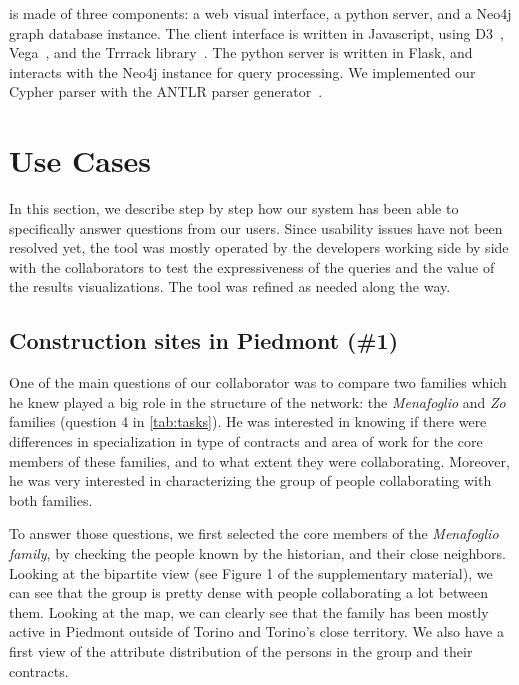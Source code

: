 \name is made of three components: a web visual interface, a python server, and a Neo4j graph database instance. The client interface is written in Javascript, using D3~\cite{d3}, Vega~\cite{satyanarayan2016vega}, and the Trrrack library~\cite{cutler_trrack_2020}. The python server is written in Flask, and interacts with the Neo4j instance for query processing.
We implemented our Cypher parser with the ANTLR parser generator~\cite{parr1995antlr}.





\section{Use Cases}\label{sec:usecases}

In this section, we describe step by step how our system has been able to specifically answer questions from our users.
Since usability issues have not been resolved yet, the tool was mostly operated by the developers working side by side with the collaborators to test the expressiveness of the queries and the value of the results visualizations. The tool was refined as needed along the way.

\subsection{Construction sites in Piedmont (\#1)}

One of the main questions of our collaborator was to compare two families which he knew played a big role in the structure of the network: the \textit{Menafoglio} and \textit{Zo} families (question 4 in \autoref{tab:tasks}). He was interested in knowing if there were differences in specialization in type of contracts and area of work for the core members of these families, and to what extent they were collaborating. Moreover, he was very interested in characterizing the group of people collaborating with both families.

To answer those questions, we first selected the core members of the \textit{Menafoglio family}, by checking the people known by the historian, and their close neighbors. Looking at the bipartite view (see Figure 1 of the supplementary material), we can see that the group is pretty dense with people collaborating a lot between them. Looking at the map, we can clearly see that the family has been mostly active in Piedmont outside of Torino and Torino's close territory. We also have a first view of the attribute distribution of the persons in the group and their contracts.

